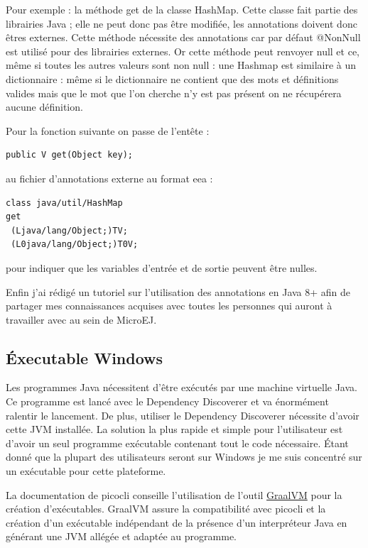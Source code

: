\documentclass[french,a4paper,12pt]{report}
\begin{document}
Pour exemple : la méthode get de la classe HashMap. Cette classe fait partie des librairies Java ; elle ne peut donc pas être modifiée, les annotations doivent donc êtres externes. Cette méthode nécessite des annotations car par défaut @NonNull est utilisé pour des librairies externes. Or cette méthode peut renvoyer null et ce, même si toutes les autres valeurs sont non null : une Hashmap est similaire à un dictionnaire : même si le dictionnaire ne contient que des mots et définitions valides mais que le mot que l'on cherche n'y est pas présent on ne récupérera aucune définition.

Pour la fonction suivante on passe de l’entête :
\begin{lstlisting}
public V get(Object key);
\end{lstlisting}

au fichier d’annotations externe au format eea :

\begin{verbatim}
class java/util/HashMap
get
 (Ljava/lang/Object;)TV;
 (L0java/lang/Object;)T0V;
\end{verbatim}

pour indiquer que les variables d'entrée et de sortie peuvent être nulles.

Enfin j'ai rédigé un tutoriel sur l'utilisation des annotations en Java 8+ afin de partager mes connaissances acquises avec toutes les personnes qui auront à travailler avec au sein de MicroEJ.

\subsection{Éxecutable Windows}

Les programmes Java nécessitent d’être exécutés par une machine virtuelle Java. Ce programme est lancé avec le Dependency Discoverer et va énormément ralentir le lancement. De plus, utiliser le Dependency Discoverer nécessite d’avoir cette JVM installée. La solution la plus rapide et simple pour l’utilisateur est d’avoir un seul programme exécutable contenant tout le code nécessaire. Étant donné que la plupart des utilisateurs seront sur Windows je me suis concentré sur un exécutable pour cette plateforme.

La documentation de picocli conseille l’utilisation de l’outil \href{https://www.graalvm.org/}{GraalVM} pour la création d’exécutables. GraalVM assure la compatibilité avec picocli et la création d’un exécutable indépendant de la présence d'un interpréteur Java en générant une JVM allégée et adaptée au programme. 
\end{document}
